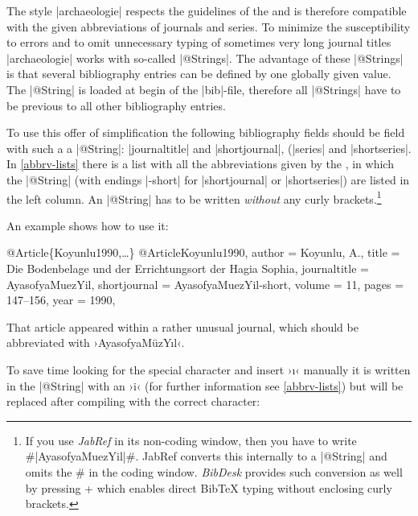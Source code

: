 \documentclass[a4paper,
10pt,
greek,
french,
spanish,
italian,
ngerman,
english
]{ltxdoc}
\begin{document}
 The style |archaeologie| respects the guidelines of the \DAI 
and is therefore compatible with the given abbreviations of journals and series.
To minimize the susceptibility to errors and to omit unnecessary typing of sometimes very long journal titles |archaeologie| works with so-called |@Strings|.
The advantage of these |@Strings| is that several bibliography entries can be defined by one globally given value. 
The |@String| is loaded at begin of the |bib|-file, therefore all |@Strings| have to be previous to all other bibliography entries.
 
To use this offer of simplification the following bibliography fields should be field with such a a |@String|: |journaltitle| and |shortjournal|,
(|series| and |shortseries|.
In \cref{abbrv-lists} there is a list with all the abbreviations given by the \DAI, 
in which the |@String| (with endings |-short| for |shortjournal| or |shortseries|) are listed in the left column.  
An |@String| has to be written \emph{without} any curly brackets.\footnote{If you use \emph{JabRef} in its non-coding window, 
then you have to write \#|AyasofyaMuezYil|\#. 
JabRef converts this internally to a |@String| and omits the \# in the coding window. 
\emph{BibDesk} provides such conversion as well by pressing
\LKeyStrg + 
 which enables direct BibTeX typing without enclosing curly brackets.}


An example shows how to use it:

\begin{bibexample}[label=Koyunlu1990]{{@}Article\{Koyunlu1990,…\}}
@Article{Koyunlu1990,
  author       = {Koyunlu, A.},
  title        = {Die Bodenbelage und der Errichtungsort der Hagia Sophia},
  journaltitle = AyasofyaMuezYil,  %
  shortjournal = AyasofyaMuezYil-short,  %
  volume       = {11},
  pages        = {147--156},
  year         = {1990},
}
\end{bibexample}


That article appeared within a rather unusual journal, 
which should be abbreviated with ›AyasofyaMüzYıl‹.

To save  time  looking for the special character and insert ›ı‹ manually 
it is written in the |@String| with an ›i‹ (for further information see \cref{abbrv-lists}) but will be replaced after compiling with the correct character:

\end{document}
